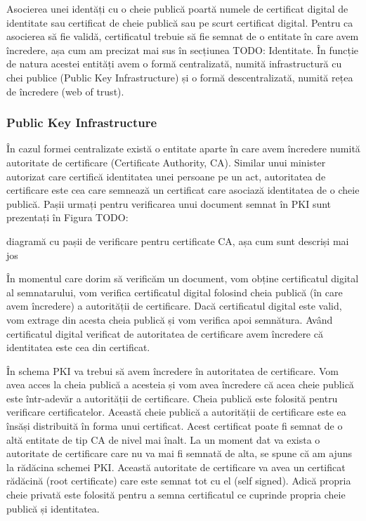 Asocierea unei identăți cu o cheie publică poartă numele de certificat digital de identitate sau certificat de cheie publică sau pe scurt certificat digital. Pentru ca asocierea să fie validă, certificatul trebuie să fie semnat de o entitate în care avem încredere, așa cum am precizat mai sus în secțiunea TODO: Identitate. În funcție de natura acestei entități avem o formă centralizată, numită infrastructură cu chei publice (Public Key Infrastructure) și o formă descentralizată, numită rețea de încredere (web of trust).

\subsubsection{Public Key Infrastructure}
\label{sec:sec:pki}

În cazul formei centralizate există o entitate aparte în care avem încredere numită autoritate de certificare (Certificate Authority, CA). Similar unui minister autorizat care certifică identitatea unei persoane pe un act, autoritatea de certificare este cea care semnează un certificat care asociază identitatea de o cheie publică. Pașii urmați pentru verificarea unui document semnat în PKI sunt prezentați în Figura TODO:

diagramă cu pașii de verificare pentru certificate CA, așa cum sunt descriși mai jos

În momentul care dorim să verificăm un document, vom obține certificatul digital al semnatarului, vom verifica certificatul digital folosind cheia publică (în care avem încredere) a autorității de certificare. Dacă certificatul digital este valid, vom extrage din acesta cheia publică și vom verifica apoi semnătura. Având certificatul digital verificat de autoritatea de certificare avem încredere că identitatea este cea din certificat.

În schema PKI va trebui să avem încredere în autoritatea de certificare. Vom avea acces la cheia publică a acesteia și vom avea încredere că acea cheie publică este într-adevăr a autorității de certificare. Cheia publică este folosită pentru verificare certificatelor. Această cheie publică a autorității de certificare este ea însăși distribuită în forma unui certificat. Acest certificat poate fi semnat de o altă entitate de tip CA de nivel mai înalt. La un moment dat va exista o autoritate de certificare care nu va mai fi semnată de alta, se spune că am ajuns la rădăcina schemei PKI. Această autoritate de certificare va avea un certificat rădăcină (root certificate) care este semnat tot cu el (self signed). Adică propria cheie privată este folosită pentru a semna certificatul ce cuprinde propria cheie publică și identitatea.


